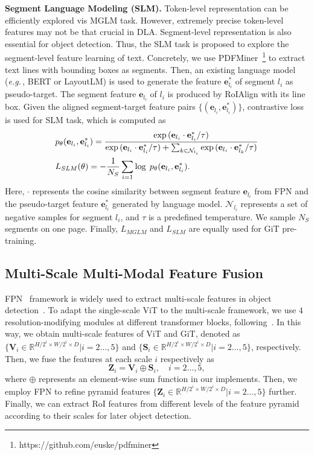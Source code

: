 \documentclass[10pt,twocolumn,letterpaper]{article}
\def\exp{\text{exp\,}}
\def\eg{\emph{e.g.}\,}
\begin{document}
\noindent
\textbf{Segment Language Modeling (SLM).}
Token-level representation can be efficiently explored vis MGLM task.
However, extremely precise token-level features may not be that crucial in DLA.
Segment-level representation is also essential for object detection.
Thus, the SLM task is proposed to explore the segment-level feature learning of text.
Concretely, we use PDFMiner~\footnote{https://github.com/euske/pdfminer} to extract text lines with bounding boxes as segments.
Then, an existing language model (\eg, BERT or LayoutLM) is used to generate the feature $\mathbf{e}_{l_i}^{*} $ of segment $l_i$ as pseudo-target.
The segment feature $\mathbf{e}_{l_i} $ of $l_i$ is produced by RoIAlign with its line box.
Given the aligned segment-target feature pairs $\{(\mathbf{e}_{l_i}, \mathbf{e}_{l_i}^{*})\}$, contrastive loss~\cite{regionclip} is used for SLM task, which is computed as
\begin{equation}
\begin{split}
& p_{\theta}( \mathbf{e}_{l_i}, \mathbf{e}_{l_i}^{*} )=\dfrac{\exp(\mathbf{e}_{l_i} \cdot \mathbf{e}_{l_i}^{*}/\tau)}{\exp(\mathbf{e}_{l_i} \cdot \mathbf{e}_{l_i}^{*}/\tau) + \sum_{k\in{\mathcal{N}_{l_i}}}\exp(\mathbf{e}_{l_i} \cdot  \mathbf{e}_{l_k}^{*}/\tau)}  \\
& L_{SLM} (\theta) = -\dfrac{1}{N_S} \sum_{i=1} \log \; p_{\theta}( \mathbf{e}_{l_i}, \mathbf{e}_{l_i}^{*} ). \nonumber
\end{split}
\end{equation}
Here, $\cdot$ represents the cosine similarity between segment feature $\mathbf{e}_{l_i}$ from FPN and the pseudo-target feature $\mathbf{e}_{l_i}^{*}$ generated by language model.
$\mathcal{N}_{l_i}$ represents a set of negative samples for segment $l_i$,
and $\tau$ is a predefined temperature. 
We sample $N_S$ segments on one page.
Finally, $L_{MGLM}$ and $L_{SLM}$ are equally used for GiT pre-training.

\subsection{Multi-Scale Multi-Modal Feature Fusion}
FPN~\cite{FPN} framework is widely used to extract multi-scale features in object detection~\cite{maskrcnn}.
To adapt the single-scale ViT to the multi-scale framework,
we use $4$ resolution-modifying modules at different transformer blocks, following~\cite{li2022dit}.
In this way, we obtain multi-scale features of ViT and GiT, denoted as 
$\{ \mathbf{V}_i \in  \mathbb{R}^{ H/2^i \times W/2^i  \times D} | i = 2\ldots,5\}$ and $\{ \mathbf{S}_i \in  \mathbb{R}^{ H/2^i \times W/2^i  \times D} | i = 2\ldots,5\}$, respectively.
Then, we fuse the features at each scale $i$ respectively as
\begin{equation}
\mathbf{Z}_i = \mathbf{V}_i \oplus \mathbf{S}_i, \quad  i = 2\ldots,5,
\end{equation}
where $\oplus$ represents an element-wise sum function in our implements.
Then, we employ FPN to refine pyramid features $\{ \mathbf{Z}_i \in  \mathbb{R}^{ H/2^i \times W/2^i  \times D}| i = 2\ldots,5\}$  further.
Finally, we can extract RoI features from different levels of the feature pyramid according to their scales for later object detection.
\end{document}
